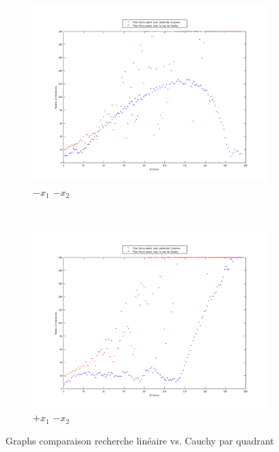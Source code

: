 \documentclass[11pt,a4paper,twoside,onecolumn,titlepage]{report}
\begin{document}
\begin{enumerate}[(a)]
\begin{figure}[h!]
	\begin{subfigure}[t]{0.5\textwidth}
		\centering
		\includegraphics[scale=0.4]{steps-quarter-1}
		\caption{$-x_1$ $-x_2$}
		\label{fig:fig:rlVSqnQ1}
	\end{subfigure}%
        ~ %
    \begin{subfigure}[t]{0.5\textwidth}
		\centering
		\includegraphics[scale=0.4]{steps-quarter-2}
		\caption{$+x_1$ $-x_2$}
		\label{fig:fig:rlVSqnQ2}
	\end{subfigure}
    \caption{Graphs comparaison recherche linéaire vs. Cauchy par quadrant}\label{fig:steps-4}
\end{figure}



\end{enumerate}
\end{document}
